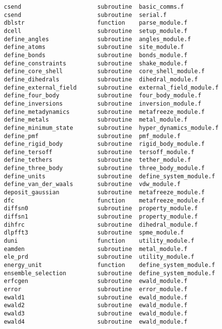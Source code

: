 \begin{verbatim}
csend                      subroutine  basic_comms.f             
csend                      subroutine  serial.f                  
dblstr                     function    parse_module.f            
dcell                      subroutine  setup_module.f            
define_angles              subroutine  angles_module.f           
define_atoms               subroutine  site_module.f             
define_bonds               subroutine  bonds_module.f            
define_constraints         subroutine  shake_module.f            
define_core_shell          subroutine  core_shell_module.f       
define_dihedrals           subroutine  dihedral_module.f         
define_external_field      subroutine  external_field_module.f   
define_four_body           subroutine  four_body_module.f        
define_inversions          subroutine  inversion_module.f        
define_metadynamics        subroutine  metafreeze_module.f       
define_metals              subroutine  metal_module.f            
define_minimum_state       subroutine  hyper_dynamics_module.f   
define_pmf                 subroutine  pmf_module.f              
define_rigid_body          subroutine  rigid_body_module.f       
define_tersoff             subroutine  tersoff_module.f          
define_tethers             subroutine  tether_module.f           
define_three_body          subroutine  three_body_module.f       
define_units               subroutine  define_system_module.f    
define_van_der_waals       subroutine  vdw_module.f              
deposit_gaussian           subroutine  metafreeze_module.f       
dfc                        function    metafreeze_module.f       
diffsn0                    subroutine  property_module.f         
diffsn1                    subroutine  property_module.f         
dihfrc                     subroutine  dihedral_module.f         
dlpfft3                    subroutine  spme_module.f             
duni                       function    utility_module.f          
eamden                     subroutine  metal_module.f            
ele_prd                    subroutine  utility_module.f          
energy_unit                function    define_system_module.f    
ensemble_selection         subroutine  define_system_module.f    
erfcgen                    subroutine  ewald_module.f            
error                      subroutine  error_module.f            
ewald1                     subroutine  ewald_module.f            
ewald2                     subroutine  ewald_module.f            
ewald3                     subroutine  ewald_module.f            
ewald4                     subroutine  ewald_module.f            

\end{verbatim}
